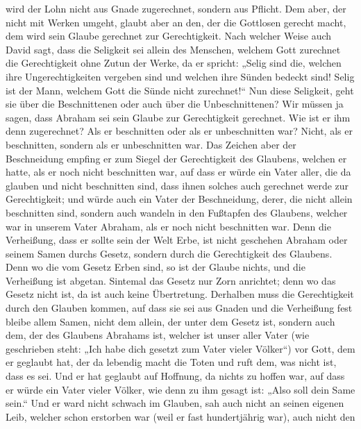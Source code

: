wird der Lohn nicht aus Gnade zugerechnet, sondern aus Pflicht.
 Dem aber, der nicht mit Werken umgeht, glaubt aber an den,
der die Gottlosen gerecht macht, dem wird sein Glaube gerechnet zur
Gerechtigkeit.  Nach welcher Weise auch David sagt, dass die
Seligkeit sei allein des Menschen, welchem Gott zurechnet die
Gerechtigkeit ohne Zutun der Werke, da er spricht:  „Selig
sind die, welchen ihre Ungerechtigkeiten vergeben sind und welchen ihre
Sünden bedeckt sind!  Selig ist der Mann, welchem Gott die
Sünde nicht zurechnet!{}``  Nun diese Seligkeit, geht sie
über die Beschnittenen oder auch über die Unbeschnittenen? Wir müssen ja
sagen, dass Abraham sei sein Glaube zur Gerechtigkeit gerechnet.
 Wie ist er ihm denn zugerechnet? Als er beschnitten oder
als er unbeschnitten war? Nicht, als er beschnitten, sondern als er
unbeschnitten war.  Das Zeichen aber der Beschneidung
empfing er zum Siegel der Gerechtigkeit des Glaubens, welchen er hatte,
als er noch nicht beschnitten war, auf dass er würde ein Vater aller,
die da glauben und nicht beschnitten sind, dass ihnen solches auch
gerechnet werde zur Gerechtigkeit;  und würde auch ein
Vater der Beschneidung, derer, die nicht allein beschnitten sind,
sondern auch wandeln in den Fußtapfen des Glaubens, welcher war in
unserem Vater Abraham, als er noch nicht beschnitten war. 
Denn die Verheißung, dass er sollte sein der Welt Erbe, ist nicht
geschehen Abraham oder seinem Samen durchs Gesetz, sondern durch die
Gerechtigkeit des Glaubens.  Denn wo die vom Gesetz Erben
sind, so ist der Glaube nichts, und die Verheißung ist abgetan.
 Sintemal das Gesetz nur Zorn anrichtet; denn wo das Gesetz
nicht ist, da ist auch keine Übertretung.  Derhalben muss
die Gerechtigkeit durch den Glauben kommen, auf dass sie sei aus Gnaden
und die Verheißung fest bleibe allem Samen, nicht dem allein, der unter
dem Gesetz ist, sondern auch dem, der des Glaubens Abrahams ist, welcher
ist unser aller Vater  (wie geschrieben steht: „Ich habe
dich gesetzt zum Vater vieler Völker``) vor Gott, dem er geglaubt hat,
der da lebendig macht die Toten und ruft dem, was nicht ist, dass es
sei.  Und er hat geglaubt auf Hoffnung, da nichts zu hoffen
war, auf dass er würde ein Vater vieler Völker, wie denn zu ihm gesagt
ist: „Also soll dein Same sein.``  Und er ward nicht
schwach im Glauben, sah auch nicht an seinen eigenen Leib, welcher schon
erstorben war (weil er fast hundertjährig war), auch nicht den
